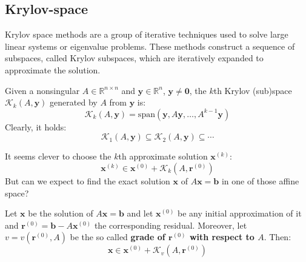 \subsection{Krylov-space}

Krylov space methods are a group of iterative techniques used to solve large linear systems or eigenvalue problems. These methods construct a sequence of subspaces, called Krylov subspaces, which are iteratively expanded to approximate the solution.

\begin{definitionbox}
    Given a nonsingular $A \in \mathbb{R}^{n \times n}$ and $\mathbf{y} \in \mathbb{R}^{n}$, $\mathbf{y} \ne \mathbf{0}$, the $k$th Krylov (sub)space $\mathcal{K}_{k}\left(A, \mathbf{y}\right)$ generated by $A$ from $\mathbf{y}$ is:
    \begin{equation}
        \mathcal{K}_{k}\left(A, \mathbf{y}\right) = \mathrm{span}\left(\mathbf{y}, A\mathbf{y}, \dots, A^{k-1}\mathbf{y}\right)
    \end{equation}
    Clearly, it holds:
    \begin{equation*}
        \mathcal{K}_{1}\left(A, \mathbf{y}\right)
        \subseteq
        \mathcal{K}_{2}\left(A, \mathbf{y}\right)
        \subseteq
        \cdots
    \end{equation*}
\end{definitionbox}

\noindent
It seems clever to choose the $k$th approximate solution $\mathbf{x}^{\left(k\right)}$:
\begin{equation*}
    \mathbf{x}^{\left(k\right)} \in \mathbf{x}^{\left(0\right)} + \mathcal{K}_{k}\left(A, \mathbf{r}^{\left(0\right)}\right)
\end{equation*}
But can we expect to find the exact solution $\mathbf{x}$ of $A\mathbf{x} = \mathbf{b}$ in one of those affine space?
\begin{lemma}
    Let $\mathbf{x}$ be the solution of $A\mathbf{x} = \mathbf{b}$ and let $\mathbf{x}^{\left(0\right)}$ be any initial approximation of it and $\mathbf{r}^{\left(0\right)} = \mathbf{b} - A\mathbf{x}^{\left(0\right)}$ the corresponding residual. Moreover, let $v = v\left(\mathbf{r}^{\left(0\right)}, A\right)$ be the so called \textbf{grade of $\mathbf{r}^{\left(0\right)}$ with respect to $A$}. Then:
    \begin{equation*}
        \mathbf{x} \in \mathbf{x}^{\left(0\right)} + \mathcal{K}_{v}\left(A, \mathbf{r}^{\left(0\right)}\right)
    \end{equation*}
\end{lemma}

